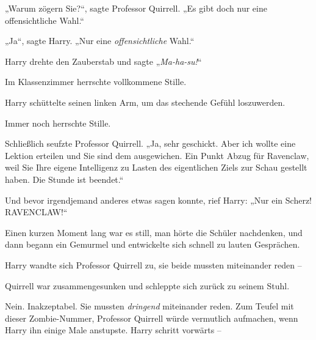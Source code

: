 „Warum zögern Sie?“, sagte Professor Quirrell. „Es gibt doch nur eine offensichtliche Wahl.“

„Ja“, sagte Harry. „Nur eine \emph{offensichtliche} Wahl.“

Harry drehte den Zauberstab und sagte „\emph{Ma-ha-su!}“

Im Klassenzimmer herrschte vollkommene Stille.

Harry schüttelte seinen linken Arm, um das stechende Gefühl loszuwerden.

Immer noch herrschte Stille.

Schließlich seufzte Professor Quirrell. „Ja, sehr geschickt. Aber ich wollte eine Lektion erteilen und Sie sind dem ausgewichen. Ein Punkt Abzug für Ravenclaw, weil Sie Ihre eigene Intelligenz zu Lasten des eigentlichen Ziels zur Schau gestellt haben. Die Stunde ist beendet.“


Und bevor irgendjemand anderes etwas sagen konnte, rief Harry: „Nur ein Scherz! RAVENCLAW!“

Einen kurzen Moment lang war es still, man hörte die Schüler nachdenken, und dann begann ein Gemurmel und entwickelte sich schnell zu lauten Gesprächen.

Harry wandte sich Professor Quirrell zu, sie beide mussten miteinander reden –

Quirrell war zusammengesunken und schleppte sich zurück zu seinem Stuhl.

Nein. Inakzeptabel. Sie mussten \emph{dringend} miteinander reden. Zum Teufel mit dieser Zombie-Nummer, Professor Quirrell würde vermutlich aufmachen, wenn Harry ihn einige Male anstupste. Harry schritt vorwärts –

